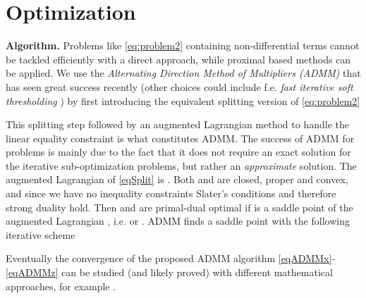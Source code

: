 \documentclass{article}
\begin{document}
\vspace{-0.05cm}
\section{Optimization}
\vspace{-0.15cm}
\label{secOpt}
{\bf Algorithm.} Problems like \eqref{eq:problem2} containing non-differential terms cannot be tackled efficiently with a direct approach, while proximal based methods can be applied. We use the \textit{Alternating Direction Method of Multipliers (ADMM)} that has seen great success recently \cite{boyd2011distributed} (other choices could include f.e. \textit{fast iterative soft thresholding} \cite{beck2009fast}) by first introducing the equivalent splitting version of \eqref{eq:problem2}
\vspace{-0.1cm}

This splitting step followed by an augmented Lagrangian method to handle the linear equality constraint is what constitutes ADMM. The success of ADMM for  problems is mainly due to the fact that it does not require an exact solution for the iterative sub-optimization problems, but rather an {\it approximate} solution. The augmented Lagrangian of \eqref{eqSplit} is . Both  and  are closed, proper and convex, and since we have no inequality constraints Slater's conditions and therefore strong duality hold. Then  and  are primal-dual optimal if  is a saddle point of the augmented Lagrangian , i.e.  or . ADMM finds a saddle point with the following iterative scheme
\vspace{-0.2cm}

\vspace{-0.5cm}

\vspace{-0.5cm}

Eventually the convergence of the proposed ADMM algorithm \eqref{eqADMMx}-\eqref{eqADMMz} can be studied (and likely proved) with different mathematical approaches, for example \cite{cai2010singular}.
\end{document}
